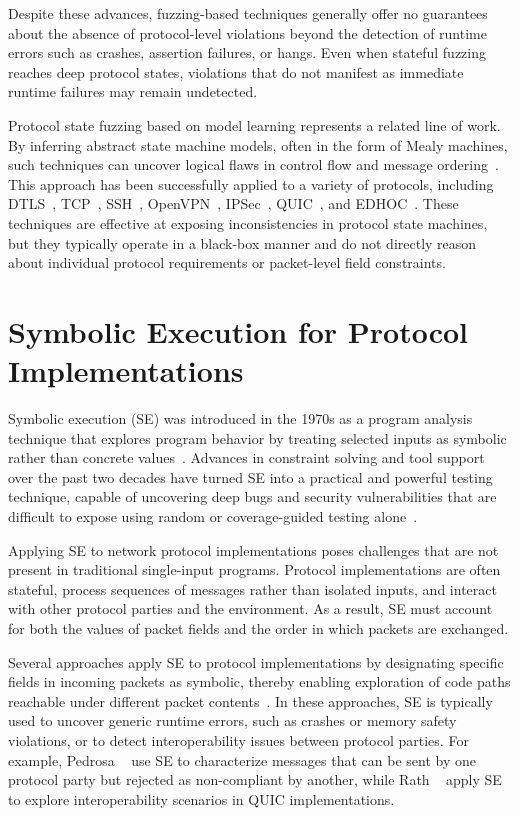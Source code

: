 Despite these advances, fuzzing-based techniques generally offer no guarantees about the absence of protocol-level violations beyond the detection of runtime errors such as crashes, assertion failures, or hangs.
Even when stateful fuzzing reaches deep protocol states, violations that do not manifest as immediate runtime failures may remain undetected.

Protocol state fuzzing based on model learning represents a related line of work.
By inferring abstract state machine models, often in the form of Mealy machines, such techniques can uncover logical flaws in control flow and message ordering~\cite{testing-via-learning,Vaandrager:cacm}.
This approach has been successfully applied to a variety of protocols, including DTLS~\cite{DTLS@USENIX-20, DTLS-Fuzzer@CSCN-25}, TCP~\cite{FH2017,FJV2016}, SSH~\cite{SSH@SPIN-2017}, OpenVPN~\cite{OpenVPN@EuroSPW-2018}, IPSec~\cite{IPSec@IEEEAccess-2019}, QUIC~\cite{Prognosis@SIGCOMM-21,rasool2019}, and EDHOC~\cite{EDHOC-Fuzzer@ISSTA-23}.
These techniques are effective at exposing inconsistencies in protocol state machines, but they typically operate in a black-box manner and do not directly reason about individual protocol requirements or packet-level field constraints.

\section{Symbolic Execution for Protocol Implementations}
Symbolic execution (SE) was introduced in the 1970s as a program analysis technique that explores program behavior by treating selected inputs as symbolic rather than concrete values~\cite{King@CACM-76}.
Advances in constraint solving and tool support over the past two decades have turned SE into a practical and powerful testing technique, capable of uncovering deep bugs and security vulnerabilities that are difficult to expose using random or coverage-guided testing alone~\cite{Cadar:3decades,KLEE@OSDI-08,S2E@12}.

Applying SE to network protocol implementations poses challenges that are not present in traditional single-input programs.
Protocol implementations are often stateful, process sequences of messages rather than isolated inputs, and interact with other protocol parties and the environment.
As a result, SE must account for both the values of packet fields and the order in which packets are exchanged.

Several approaches apply SE to protocol implementations by designating specific fields in incoming packets as symbolic, thereby enabling exploration of code paths reachable under different packet contents~\cite{KleeNet,KleeNet-poster,PedrosaFKGMM15,RathSW18,SymbexNet,tempel2023specification, wilson2024analysing}.
In these approaches, SE is typically used to uncover generic runtime errors, such as crashes or memory safety violations, or to detect interoperability issues between protocol parties.
For example, Pedrosa \etal~\cite{PedrosaFKGMM15} use SE to characterize messages that can be sent by one protocol party but rejected as non-compliant by another, while Rath \etal~\cite{RathSW18} apply SE to explore interoperability scenarios in QUIC implementations.


